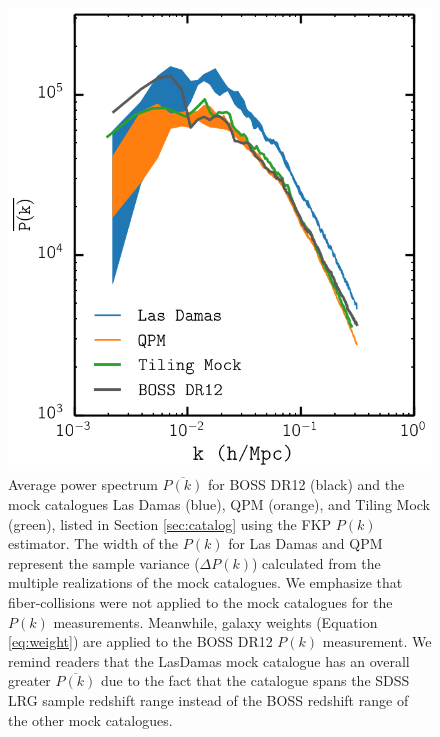\documentclass{emulateapj}
\begin{document}
\begin{figure}
\begin{center}
\includegraphics[scale=0.5]{fcpaper_pk_comp.png} 
\caption{Average power spectrum $\overline{P(k)}$ for BOSS DR12 (black) and the mock catalogues Las Damas (blue), QPM (orange), and Tiling Mock (green), listed in Section \ref{sec:catalog} using the FKP $P(k)$ estimator. The width of the $P(k)$ for Las Damas and QPM represent the sample variance ($\Delta P(k)$) calculated from the multiple realizations of the mock catalogues. We emphasize that fiber-collisions were not applied to the mock catalogues for the $P(k)$ measurements. Meanwhile, galaxy weights (Equation \ref{eq:weight}) are applied to the BOSS DR12 $P(k)$ measurement. We remind readers that the LasDamas mock catalogue has an overall greater $\overline{P(k)}$ due to the fact that the catalogue spans the SDSS LRG sample redshift range instead of the BOSS redshift range of the other mock catalogues.} \label{fig:mockpk}
\end{center}
\end{figure}
\end{document}
